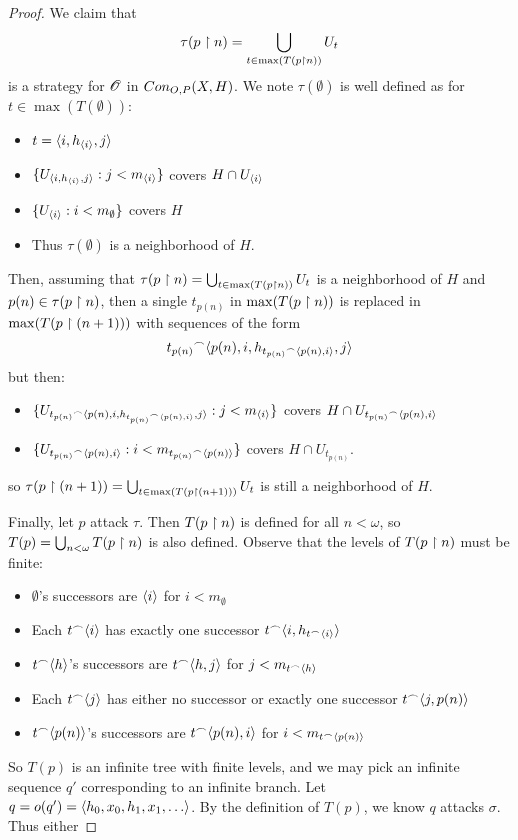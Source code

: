\begin{proof}
  We claim that 
    \[
      \tau(p\restriction n)=\bigcup_{t\in\max(T(p\restriction n))}U_t
    \] 
  is a strategy for $\mathscr{O}$ in $Con_{O,P}(X,H)$. We note $\tau(\emptyset)$ is well defined as for $t\in\max(T(\emptyset))$: 
    \begin{itemize}
      \item $t=\langle i,h_{\langle i\rangle},j\rangle$
      \item $\{U_{\langle i,h_{\langle i\rangle},j\rangle}:j<m_{\langle i\rangle}\}$ covers $H\cap U_{\langle i\rangle}$
      \item $\{U_{\langle i\rangle}:i<m_{\emptyset}\}$ covers $H$
      \item Thus $\tau(\emptyset)$ is a neighborhood of $H$.
    \end{itemize}

  Then, assuming that $\tau(p\restriction n)=\bigcup_{t\in\max(T(p\restriction n))}U_t$ is a neighborhood of $H$ and $p(n)\in\tau(p\restriction n)$, then a single $t_{p(n)}$ in $\max(T(p\restriction n))$ is replaced in $\max(T(p\restriction (n+1)))$ with sequences of the form 
    \[
      {t_{p(n)}}^\frown\langle p(n),i,h_{{t_{p(n)}}^\frown\langle p(n),i\rangle},j\rangle
    \]
  but then:
    \begin{itemize}
      \item $\{U_{{t_{p(n)}}^\frown\langle p(n),i,h_{{t_{p(n)}}^\frown\langle p(n),i\rangle},j\rangle}:j<m_{\langle i\rangle}\}$ covers $H\cap U_{{t_{p(n)}}^\frown\langle p(n),i\rangle}$
      \item $\{U_{{t_{p(n)}}^\frown\langle p(n),i\rangle}:i<m_{{t_{p(n)}}^\frown\langle p(n)\rangle}\}$ covers $H\cap U_{t_{p(n)}}$.
    \end{itemize}
  so $\tau(p\restriction (n+1))=\bigcup_{t\in\max(T(p\restriction (n+1)))}U_t$ is still a neighborhood of $H$.

  Finally, let $p$ attack $\tau$. Then $T(p\restriction n)$ is defined for all $n<\omega$, so $T(p)=\bigcup_{n<\omega} T(p\restriction n)$ is also defined. Observe that the levels of $T(p\restriction n)$ must be finite:
    \begin{itemize}
      \item $\emptyset$'s successors are $\langle i\rangle$ for $i<m_{\emptyset}$
      \item Each $t^\frown\langle i\rangle$ has exactly one successor $t^\frown\langle i,h_{t^\frown\langle i\rangle}\rangle$
      \item $t^\frown\langle h\rangle$'s successors are $t^\frown\langle h,j\rangle$ for $j<m_{t^\frown\langle h\rangle}$
      \item Each $t^\frown\langle j\rangle$ has either no successor or exactly one successor $t^\frown\langle j,p(n)\rangle$
      \item $t^\frown\langle p(n)\rangle$'s successors are $t^\frown\langle p(n),i\rangle$ for $i<m_{t^\frown\langle p(n)\rangle}$
    \end{itemize}

  So $T(p)$ is an infinite tree with finite levels, and we may pick an infinite sequence $q'$ corresponding to an infinite branch. Let $q=o(q')=\<h_0,x_0,h_1,x_1,\dots\>$. By the definition of $T(p)$, we know $q$ attacks $\sigma$. Thus either 
\end{proof}

